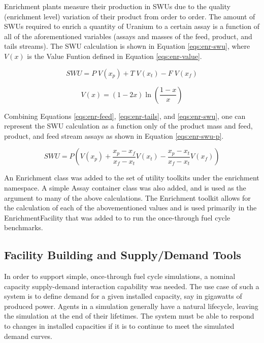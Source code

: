 Enrichment plants measure their production in SWUs due to the quality
(enrichment level) variation of their product from order to order. The amount of
SWUs required to enrich a quantity of Uranium to a certain assay is a
function of all of the aforementioned variables (assays and masses of the
feed, product, and tails streams). The SWU calculation is shown in Equation
\ref{eqs:enr-swu}, where $V(x)$ is the Value Funtion defined in Equation
\ref{eqs:enr-value}.

\begin{equation}\label{eqs:enr-swu}
  SWU = P \; V(x_{p}) + T \; V(x_{t}) - F \; V(x_{f})
\end{equation}

\begin{equation}\label{eqs:enr-value}
  V(x) = (1 - 2x) \ln \left( \frac{1-x}{x} \right)
\end{equation}

Combining Equations \ref{eqs:enr-feed}, \ref{eqs:enr-tails}, and
\ref{eqs:enr-swu}, one can represent the SWU calculation as a function only of
the product mass and feed, product, and feed stream assays as shown in
Equation \ref{eqs:enr-swu-p}.

\begin{equation}\label{eqs:enr-swu-p}
  SWU = P \left( V(x_{p}) + \frac{x_{p} - x_{f}}{x_{f} - x_{t}} V(x_{t}) 
        - \frac{x_{p} - x_{t}}{x_{f} - x_{t}} V(x_{f}) \right)
\end{equation}

An Enrichment class was added to the \Cyclus set of utility toolkits under the
enrichment namespace. A simple Assay container class was also added, and is used
as the argument to many of the above calculations. The Enrichment toolkit allows
for the calculation of each of the abovementioned values and is used primarily
in the EnrichmentFacility that was added to \Cycamore to run the once-through
fuel cycle benchmarks.

\subsection{Facility Building and Supply/Demand Tools}

In order to support simple, once-through fuel cycle simulations, a nominal
capacity supply-demand interaction capability was needed. The use case of such a
system is to define demand for a given installed capacity, say in gigawatts of
produced power. Agents in a \Cyclus simulation generally have a natural
lifecycle, leaving the simulation at the end of their lifetimes. The system must
be able to respond to changes in installed capacities if it is to continue to
meet the simulated demand curves.

